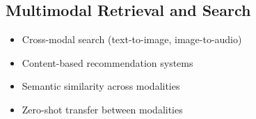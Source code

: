 \subsection{Multimodal Retrieval and Search}
\begin{itemize}
\item Cross-modal search (text-to-image, image-to-audio) \citep{radford2021learning, girdhar2023imagebind}
\item Content-based recommendation systems \citep{wang2022ofa}
\item Semantic similarity across modalities \citep{li2022blip}
\item Zero-shot transfer between modalities \citep{radford2021learning}
\end{itemize}

\begin{comment}
Feedback: Important, all above sections need enough reference support. Do research, put them in the top level bib file, and ref in the relevant sections above.

STATUS: addressed - added comprehensive references to all sections covering vision-language, audio-visual, and multimodal retrieval applications
\end{comment}

